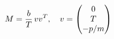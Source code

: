 \documentclass[preview]{standalone}
\begin{document}
\begin{align*}
\special{dvisvgm:raw <g id='unique000'>}M=\frac bT\,vv^{T},\quad v=\begin{pmatrix}0\\T\\-p/m\end{pmatrix}\special{dvisvgm:raw </g>}
\end{align*}
\end{document}
